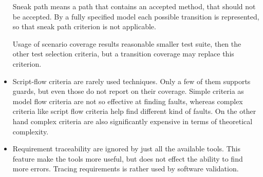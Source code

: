 \begin{itemize}
	Sneak path means a path that contains an accepted method, that should not be accepted. By a fully specified model each possible transition is represented, so that sneak path criterion is not applicable.
	
	Usage of scenario coverage results reasonable smaller test suite, then the other test selection criteria, but a transition coverage may replace this criterion.
	\item Script-flow criteria are rarely used techniques. Only a few of them supports guards, but even those do not report on their coverage. Simple criteria as model flow criteria are not so effective at finding faults, whereas complex criteria like script flow criteria help find different kind of faults. On the other hand complex criteria are also significantly expensive in terms of theoretical complexity.
	\item Requirement traceability are ignored by just all the available tools. This feature make the tools more useful, but does not effect the ability to find more errors. Tracing requirements is rather used by software validation.
\end{itemize}



